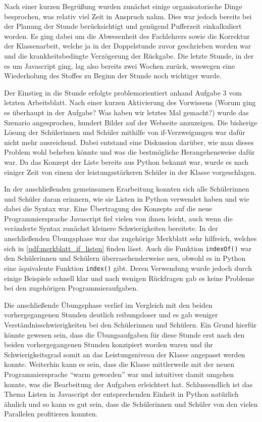 Nach einer kurzen Begrüßung wurden zunächst einige organisatorische Dinge besprochen, was relativ viel Zeit in Anspruch nahm.
Dies war jedoch bereits bei der Planung der Stunde berücksichtigt und genügend Pufferzeit einkalkuliert worden.
Es ging dabei um die Abwesenheit des Fachlehrers sowie die Korrektur der Klassenarbeit, welche ja in der Doppelstunde zuvor geschrieben worden war und die krankheitsbedingte Verzögerung der Rückgabe.
Die letzte Stunde, in der es um Javascript ging, lag also bereits zwei Wochen zurück, weswegen eine Wiederholung des Stoffes zu Beginn der Stunde noch wichtiger wurde.

Der Einstieg in die Stunde erfolgte problemorientiert anhand Aufgabe 3 vom letzten Arbeitsblatt.
Nach einer kurzen Aktivierung des Vorwissens (Worum ging es überhaupt in der Aufgabe? Was haben wir letztes Mal gemacht?) wurde das Szenario angesprochen, hundert Bilder auf der Webseite anzuzeigen.
Die bisherige Lösung der Schülerinnen und Schüler mithilfe von if-Verzweigungen war dafür nicht mehr ausreichend.
Dabei entstand eine Diskussion darüber, wie man dieses Problem wohl beheben könnte und was die bestmögliche Herangehensweise dafür war.
Da das Konzept der Liste bereits aus Python bekannt war, wurde es nach einiger Zeit von einem der leistungsstärkeren Schüler in der Klasse vorgeschlagen.

In der anschließenden gemeinsamen Erarbeitung konnten sich alle Schülerinnen und Schüler daran erinnern, wie sie Listen in Python verwendet haben und wie dabei die Syntax war.
Eine Übertragung des Konzepts auf die neue Programmiersprache Javascript fiel vielen von ihnen leicht, auch wenn die veränderte Syntax zunächst kleinere Schwierigkeiten bereitete.
In der anschließenden Übungsphase war das zugehörige Merkblatt sehr hilfreich, welches sich in \autoref{pdf:merkblatt_if_listen} finden lässt.
Auch die Funktion \texttt{indexOf()} war den Schülerinnen und Schülern überraschenderweise neu, obwohl es in Python eine äquivalente Funktion \texttt{index()} gibt.
Deren Verwendung wurde jedoch durch einige Beispiele schnell klar und nach wenigen Rückfragen gab es keine Probleme bei den zugehörigen Programmieraufgaben.

Die anschließende Übungsphase verlief im Vergleich mit den beiden vorhergegangenen Stunden deutlich reibungsloser und es gab weniger Verständnisschwierigkeiten bei den Schülerinnen und Schülern.
Ein Grund hierfür könnte gewesen sein, dass die Übungsaufgaben für diese Stunde erst nach den beiden vorhergegangenen Stunden konzipiert worden waren und ihr Schwierigkeitsgrad somit an das Leistungsniveau der Klasse angepasst werden konnte.
Weiterhin kann es sein, dass die Klasse mittlerweile mit der neuen Programmiersprache ``warm geworden'' war und intuitiver damit umgehen konnte, was die Bearbeitung der Aufgaben erleichtert hat.
Schlussendlich ist das Thema Listen in Javascript der entsprechenden Einheit in Python natürlich ähnlich und so kann es gut sein, dass die Schülerinnen und Schüler von den vielen Parallelen profitieren konnten.

